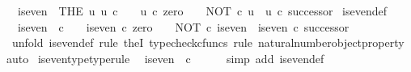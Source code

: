 \begin{isabellebody}
\ \ {\isachardoublequoteopen}is{\isacharunderscore}{\kern0pt}even\ {\isacharequal}{\kern0pt}\ {\isacharparenleft}{\kern0pt}THE\ u{\isachardot}{\kern0pt}\ u{\isacharcolon}{\kern0pt}\ {\isasymnat}\isactrlsub c\ {\isasymrightarrow}\ {\isasymOmega}\ {\isasymand}\ u\ {\isasymcirc}\isactrlsub c\ zero\ {\isacharequal}{\kern0pt}\ {\isasymt}\ {\isasymand}\ NOT\ {\isasymcirc}\isactrlsub c\ u\ {\isacharequal}{\kern0pt}\ u\ {\isasymcirc}\isactrlsub c\ successor{\isacharparenright}{\kern0pt}{\isachardoublequoteclose}\isanewline
\isanewline
{}\isamarkupfalse%
\ is{\isacharunderscore}{\kern0pt}even{\isacharunderscore}{\kern0pt}def{}{\isacharcolon}{\kern0pt}\isanewline
\ \ {\isachardoublequoteopen}is{\isacharunderscore}{\kern0pt}even\ {\isacharcolon}{\kern0pt}\ {\isasymnat}\isactrlsub c\ {\isasymrightarrow}\ {\isasymOmega}\ {\isasymand}\ is{\isacharunderscore}{\kern0pt}even\ {\isasymcirc}\isactrlsub c\ zero\ {\isacharequal}{\kern0pt}\ {\isasymt}\ {\isasymand}\ NOT\ {\isasymcirc}\isactrlsub c\ is{\isacharunderscore}{\kern0pt}even\ {\isacharequal}{\kern0pt}\ is{\isacharunderscore}{\kern0pt}even\ {\isasymcirc}\isactrlsub c\ successor{\isachardoublequoteclose}\isanewline
%
\isadelimproof
\ \ %
\endisadelimproof
%
\isatagproof
{}\isamarkupfalse%
\ {\isacharparenleft}{\kern0pt}unfold\ is{\isacharunderscore}{\kern0pt}even{\isacharunderscore}{\kern0pt}def{\isacharcomma}{\kern0pt}\ rule\ theI{\isacharprime}{\kern0pt}{\isacharcomma}{\kern0pt}\ typecheck{\isacharunderscore}{\kern0pt}cfuncs{\isacharcomma}{\kern0pt}\ rule\ natural{\isacharunderscore}{\kern0pt}number{\isacharunderscore}{\kern0pt}object{\isacharunderscore}{\kern0pt}property{}{\isacharcomma}{\kern0pt}\ auto{\isacharparenright}{\kern0pt}%
\endisatagproof
{\isafoldproof}%
%
\isadelimproof
\isanewline
%
\endisadelimproof
\isanewline
{}\isamarkupfalse%
\ is{\isacharunderscore}{\kern0pt}even{\isacharunderscore}{\kern0pt}type{\isacharbrackleft}{\kern0pt}type{\isacharunderscore}{\kern0pt}rule{\isacharbrackright}{\kern0pt}{\isacharcolon}{\kern0pt}\isanewline
\ \ {\isachardoublequoteopen}is{\isacharunderscore}{\kern0pt}even\ {\isacharcolon}{\kern0pt}\ {\isasymnat}\isactrlsub c\ {\isasymrightarrow}\ {\isasymOmega}{\isachardoublequoteclose}\isanewline
%
\isadelimproof
\ \ %
\endisadelimproof
%
\isatagproof
{}\isamarkupfalse%
\ {\isacharparenleft}{\kern0pt}simp\ add{\isacharcolon}{\kern0pt}\ is{\isacharunderscore}{\kern0pt}even{\isacharunderscore}{\kern0pt}def{}{\isacharparenright}{\kern0pt}%
\endisatagproof
{\isafoldproof}%
%
\isadelimproof

\end{isabellebody}
